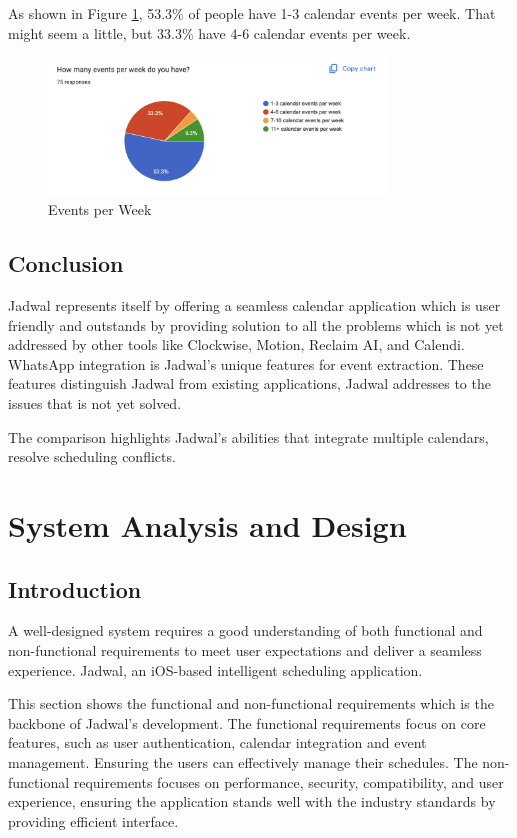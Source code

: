 \documentclass[12pt,a4paper]{report}
\begin{document}
As shown in Figure \ref{fig:events-per-week}, 53.3\% of people have 1-3 calendar events per week. That might seem a little, but 33.3\% have 4-6 calendar events per week.

\begin{figure}[!h]
    \centering
    \includegraphics[width=0.8\textwidth]{images/survey/events-per-week.png}
    \caption{Events per Week}
    \label{fig:events-per-week}
\end{figure}

\section{Conclusion}

Jadwal represents itself by offering a seamless calendar application which is user friendly and outstands by providing solution to all the problems which is not yet addressed by other tools like Clockwise, Motion, Reclaim AI, and Calendi. WhatsApp integration is Jadwal’s unique features for event extraction. These features distinguish Jadwal from existing applications, Jadwal addresses to the issues that is not yet solved.

The comparison highlights Jadwal's abilities that integrate multiple calendars, resolve scheduling conflicts. 

\chapter{System Analysis and Design}

\section{Introduction}

A well-designed system requires a good understanding of both functional and non-functional requirements to meet user expectations and deliver a seamless experience. Jadwal, an iOS-based intelligent scheduling application. 

This section shows the functional and non-functional requirements which is the backbone of Jadwal's development. The functional requirements focus on core features, such as user authentication, calendar integration and event management. Ensuring the users can effectively manage their schedules. The non-functional requirements focuses on performance, security, compatibility, and user experience, ensuring the application stands well with the industry standards by providing efficient interface.
\end{document}
